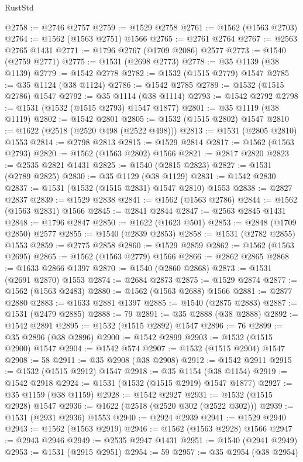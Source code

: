 \begin{lexlean}{RustStd}
\begin{coremodule}
@2758 := @2746 @2757
@2759 := @1529 @2758
@2761 := @1562 (@1563 @2703)
@2764 := @1562 (@1563 @2751) @1566
@2765 := @2761 @2764
@2767 := @2563 @2765 @1431
@2771 := @1796 @2767 (@1709 @2086) @2577
@2773 := @1540 (@2759 @2771)
@2775 := @1531 (@2698 @2773)
@2778 := @35 @1139 (@38 @1139)
@2779 := @1542 @2778
@2782 := @1532 (@1515 @2779) @1547
@2785 := @35 @1124 (@38 @1124)
@2786 := @1542 @2785
@2789 := @1532 (@1515 @2786) @1547
@2792 := @35 @1114 (@38 @1114)
@2793 := @1542 @2792
@2798 := @1531 (@1532 (@1515 @2793) @1547 @1877)
@2801 := @35 @1119 (@38 @1119)
@2802 := @1542 @2801
@2805 := @1532 (@1515 @2802) @1547
@2810 := @1622 (@2518 (@2520 @498 (@2522 @498)))
@2813 := @1531 (@2805 @2810) @1553
@2814 := @2798 @2813
@2815 := @1529 @2814
@2817 := @1562 (@1563 @2793)
@2820 := @1562 (@1563 @2802) @1566
@2821 := @2817 @2820
@2823 := @2535 @2821 @1431
@2825 := @1540 (@2815 @2823)
@2827 := @1531 (@2789 @2825)
@2830 := @35 @1129 (@38 @1129)
@2831 := @1542 @2830
@2837 := @1531 (@1532 (@1515 @2831) @1547 @2810) @1553
@2838 := @2827 @2837
@2839 := @1529 @2838
@2841 := @1562 (@1563 @2786)
@2844 := @1562 (@1563 @2831) @1566
@2845 := @2841 @2844
@2847 := @2563 @2845 @1431
@2848 := @1796 @2847
@2850 := @1622 (@1623 @501)
@2853 := @2848 (@1709 @2850) @2577
@2855 := @1540 (@2839 @2853)
@2858 := @1531 (@2782 @2855) @1553
@2859 := @2775 @2858
@2860 := @1529 @2859
@2862 := @1562 (@1563 @2695)
@2865 := @1562 (@1563 @2779) @1566
@2866 := @2862 @2865
@2868 := @1633 @2866 @1397
@2870 := @1540 (@2860 @2868)
@2873 := @1531 (@2691 @2870) @1553
@2874 := @2684 @2873
@2875 := @1529 @2874
@2877 := @1562 (@1563 @2483)
@2880 := @1562 (@1563 @2688) @1566
@2881 := @2877 @2880
@2883 := @1633 @2881 @1397
@2885 := @1540 (@2875 @2883)
@2887 := @1531 (@2479 @2885)
@2888 := 79
@2891 := @35 @2888 (@38 @2888)
@2892 := @1542 @2891
@2895 := @1532 (@1515 @2892) @1547
@2896 := 76
@2899 := @35 @2896 (@38 @2896)
@2900 := @1542 @2899
@2903 := @1532 (@1515 @2900) @1547
@2904 := @1542 @574
@2907 := @1532 (@1515 @2904) @1547
@2908 := 58
@2911 := @35 @2908 (@38 @2908)
@2912 := @1542 @2911
@2915 := @1532 (@1515 @2912) @1547
@2918 := @35 @1154 (@38 @1154)
@2919 := @1542 @2918
@2924 := @1531 (@1532 (@1515 @2919) @1547 @1877)
@2927 := @35 @1159 (@38 @1159)
@2928 := @1542 @2927
@2931 := @1532 (@1515 @2928) @1547
@2936 := @1622 (@2518 (@2520 @302 (@2522 @302)))
@2939 := @1531 (@2931 @2936) @1553
@2940 := @2924 @2939
@2941 := @1529 @2940
@2943 := @1562 (@1563 @2919)
@2946 := @1562 (@1563 @2928) @1566
@2947 := @2943 @2946
@2949 := @2535 @2947 @1431
@2951 := @1540 (@2941 @2949)
@2953 := @1531 (@2915 @2951)
@2954 := 59
@2957 := @35 @2954 (@38 @2954)

\end{coremodule}
\end{lexlean}
